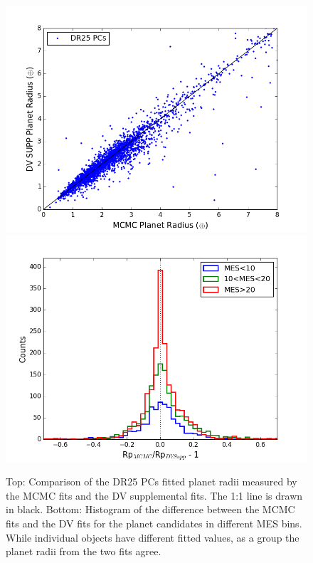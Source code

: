 \begin{figure}
\centering
\includegraphics[width=0.99\linewidth]{fig-comparePradius-mcmcSup.png}
\includegraphics[width=0.99\linewidth]{fig-comparePradius-histogram.png}
\caption{Top: Comparison of the DR25 PCs fitted planet radii measured by the MCMC fits and the DV supplemental fits. The 1:1 line is drawn in black. Bottom: Histogram of the difference between the MCMC fits and the DV fits for the planet candidates in different MES bins. While individual objects have different fitted values, as a group the planet radii from the two fits agree. }
\label{f:mcmcsupp}
\end{figure}


